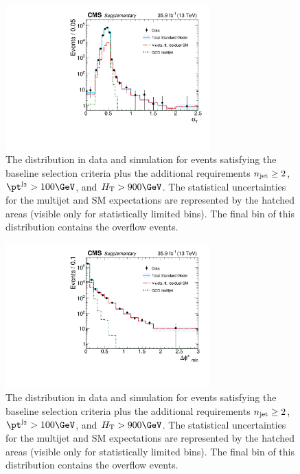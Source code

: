 \clearpage
\begin{figure}[p]
  \caption{ The \alphat distribution in data and simulation for events
    satisfying the baseline selection criteria plus the
    additional requirements $n_{\text{jet}} \geq 2$, $\pt^{\jet{2}} > 100\GeV$,
    and $\scalht > 900\GeV$. The statistical uncertainties for the
    multijet and SM expectations are represented by the hatched areas
    (visible only for statistically limited bins). The final bin of
    this distribution contains the overflow events.
    \label{fig:alphaT} }
  \begin{center}
  \includegraphics[width=0.7\textwidth]{Supplementary/CMS-SUS-16-038_Figure-aux_008}
  \end{center}
\end{figure}


\begin{figure}[p]
    \caption{ The \bdphi distribution in data and simulation for
      events satisfying the baseline selection criteria plus
      the additional requirements $n_{\text{jet}} \geq 2$, $\pt^{\jet{2}} >
      100\GeV$, and $\scalht > 900\GeV$. The statistical uncertainties
      for the multijet and SM expectations are represented by the
      hatched areas (visible only for statistically limited bins). The
      final bin of this distribution contains the overflow events. 
      \label{fig:bDPhi} }
  \begin{center}
  \includegraphics[width=0.7\textwidth]{Supplementary/CMS-SUS-16-038_Figure-aux_009}
  \end{center}
\end{figure}


